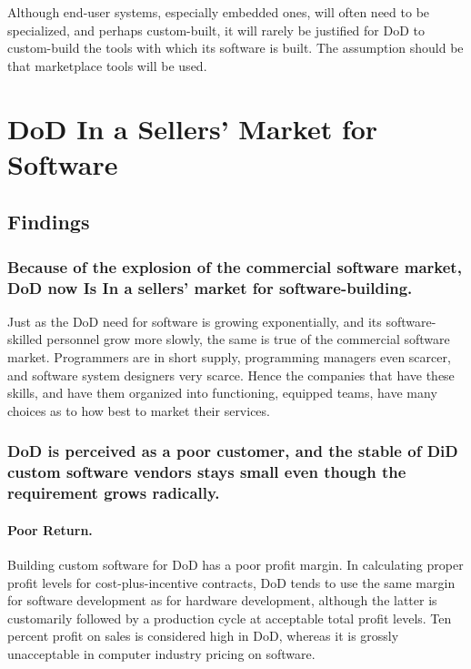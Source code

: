 \documentclass[12pt]{article}
\begin{document}
Although end-user systems, especially embedded ones, will often need to be
specialized, and perhaps custom-built, it will rarely be justified for DoD to
custom-build the tools with which its software is built. The assumption should
be that marketplace tools will be used.

\section{DoD In a Sellers' Market for Software}

\subsection*{Findings}

\subsubsection*{Because of the explosion of the commercial software market, DoD
now Is In a sellers' market for software-building.}

Just as the DoD need for software is growing exponentially, and its
software-skilled personnel grow more slowly, the same is true of the commercial
software market. Programmers are in short supply, programming managers even
scarcer, and software system designers very scarce. Hence the companies that
have these skills, and have them organized into functioning, equipped teams,
have many choices as to how best to market their services.

\subsubsection*{DoD is perceived as a poor customer, and the stable of DiD custom software
vendors stays small even though the requirement grows radically.}

\paragraph{Poor Return.} Building custom software for DoD has a poor profit
margin. In calculating proper profit levels for cost-plus-incentive contracts,
DoD tends to use the same margin for software development as for hardware
development, although the latter is customarily followed by a production cycle
at acceptable total profit levels. Ten percent profit on sales is considered
high in DoD, whereas it is grossly unacceptable in computer industry pricing on
software.
\end{document}
